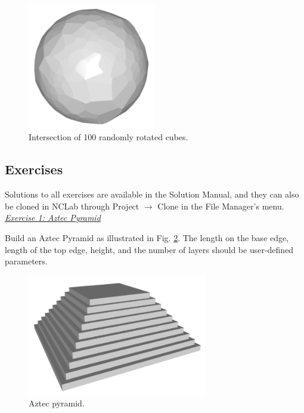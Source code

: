 \documentclass[article,A4,12pt]{llncs}
\begin{document}
\begin{figure}[!ht]
\begin{center}
\includegraphics[width=0.5\textwidth]{img/random_cubes.png}
\end{center}
\vspace{-2mm}
\caption{Intersection of 100 randomly rotated cubes.}
\label{fig:random_cubes}
\end{figure}
\noindent





\subsection{Exercises}

Solutions to all exercises are available in the Solution Manual, and 
they can also be cloned in NCLab through Project $\rightarrow$ Clone in the 
File Manager's menu.\\

\noindent
\underline{\em Exercise 1: Aztec Pyramid}

Build an Aztec Pyramid as illustrated in Fig. \ref{fig:aztec}. The length 
on the base edge, length of the top edge, height, and the number of layers
should be user-defined parameters. 


\begin{figure}[!ht]
\begin{center}
\includegraphics[width=0.7\textwidth]{img/aztec.png}
\end{center}
\vspace{-2mm}
\caption{Aztec pyramid.}
\label{fig:aztec}
\end{figure}
\noindent
\end{document}
